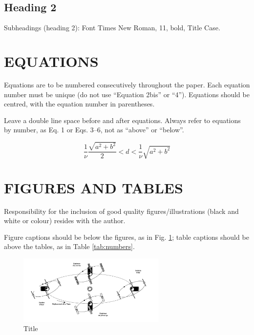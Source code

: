 \documentclass{esagnc}
\begin{document}
\subsection{Heading 2}

Subheadings (heading 2): Font Times New Roman, 11, bold, Title Case.

\section{EQUATIONS}

Equations are to be numbered consecutively throughout the paper. Each equation number must be unique (do not use ``Equation 2bis'' or ``4''). Equations should be centred, with the equation number in parentheses.

Leave a double line space before and after equations. Always refer to equations by number, as Eq. 1 or Eqs. 3--6, not as ``above'' or ``below''.

\begin{equation}
    \frac{1}{\nu} \frac{\sqrt{a^2 + b^2}}{2} < d < \frac{1}{\nu}\sqrt{a^2 + b^2}
\end{equation}

\section{FIGURES AND TABLES}

Responsibility for the inclusion of good quality figures/illustrations (black and white or colour) resides with the author.

\bigskip

Figure captions should be below the figures, as in Fig. \ref{fig:orbit}; table captions should be above the tables, as in Table \ref{tab:numbers}.

\begin{figure}[t]
  \centering
 \includegraphics[width=0.65\textwidth]{fig/orbit.png}
  \caption{Title}
  \label{fig:orbit}
\end{figure}
\end{document}

